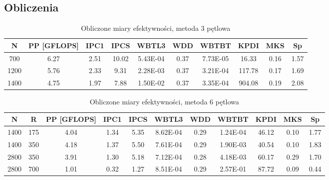 \documentclass[12pt,a4paper]{article}
\begin{document}
\subsection{Obliczenia}

\begin{table}[H]
\centering
\def\arraystretch{1.5}
\begin{adjustbox}{width=1\textwidth}
\begin{tabular}{|c|c|c|c|c|c|c|c|c|c|}
\hline
N 	& PP {\small[GFLOPS]}	&	IPC1	&	IPCS	&	WBTL3	&	WDD	&	WBTBT	&	KPDI	&	MKS	&	Sp	\\ \hline
700&6.27	&	2.51	&	10.02	&	5.43E-04	&	0.37	&	7.73E-05	&	16.33	&	0.16	&	1.57	\\ \hline
1200&5.76	&	2.33	&	9.31	&	2.28E-03	&	0.37	&	3.21E-04	&	117.78	&	0.17	&	1.69	\\ \hline
1400&4.75	&	1.97	&	7.88	&	1.50E-02	&	0.37	&	3.35E-04	&	904.08	&	0.19	&	2.08	\\ \hline
\end{tabular}
\end{adjustbox}
\caption{Obliczone miary efektywności, metoda 3 pętlowa}
\label{table:ijk}
\end{table}


\begin{table}[H]
\centering
\def\arraystretch{1.5}
\begin{adjustbox}{width=1\textwidth}
\begin{tabular}{|c|c|c|c|c|c|c|c|c|c|c|}
\hline
N	&R	&PP {\small[GFLOPS]}	&	IPC1	&	IPCS	&	WBTL3	&	WDD	&	WBTBT	&	KPDI	&	MKS	&	Sp	\\ \hline
1400&175&4.04	&	1.34	&	5.35	&	8.62E-04	&	0.29	&	1.24E-04	&	46.12	&	0.10	&	1.77	\\ \hline
1400&350&4.18	&	1.37	&	5.50	&	7.61E-04	&	0.29	&	1.90E-03	&	40.54	&	0.10	&	1.83	\\ \hline
2800&350&3.91	&	1.30	&	5.18	&	7.12E-04	&	0.28	&	4.18E-03	&	60.17	&	0.29	&	1.70	\\ \hline
2800&700&1.01	&	0.32	&	1.27	&	8.51E-04	&	0.29	&	2.57E-01	&	87.72	&	0.09	&	0.44	\\ \hline
\end{tabular}
\end{adjustbox}
\caption{Obliczone miary efektywności, metoda 6 pętlowa}
\label{table:ijkiijjkk}
\end{table}
\end{document}
